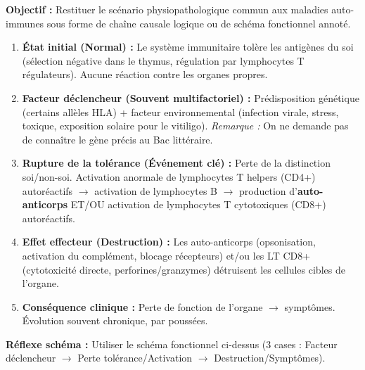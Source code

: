 \documentclass[11pt]{article}
\newcommand{\cle}[1]{{\popxbold\color{popdark}#1}}
\begin{document}
\begin{methode}
\textbf{Objectif :} Restituer le scénario physiopathologique commun aux maladies auto-immunes sous forme de chaîne causale logique ou de schéma fonctionnel annoté.
\begin{enumerate}
    \item \textbf{État initial (Normal) :} Le système immunitaire tolère les antigènes du \cle{soi} (sélection négative dans le thymus, régulation par lymphocytes T régulateurs). Aucune réaction contre les organes propres.
    \item \textbf{Facteur déclencheur (Souvent multifactoriel) :} Prédisposition génétique (certains allèles HLA) + facteur environnemental (infection virale, stress, toxique, exposition solaire pour le vitiligo). \emph{Remarque :} On ne demande pas de connaître le gène précis au Bac littéraire.
    \item \textbf{Rupture de la tolérance (Événement clé) :} Perte de la distinction soi/non-soi. Activation anormale de lymphocytes T helpers (CD4+) autoréactifs $\rightarrow$ activation de lymphocytes B $\rightarrow$ production d'\textbf{auto-anticorps} ET/OU activation de lymphocytes T cytotoxiques (CD8+) autoréactifs.
    \item \textbf{Effet effecteur (Destruction) :} Les auto-anticorps (opsonisation, activation du complément, blocage récepteurs) et/ou les LT CD8+ (cytotoxicité directe, perforines/granzymes) détruisent les cellules cibles de l'organe.
    \item \textbf{Conséquence clinique :} Perte de fonction de l'organe $\rightarrow$ symptômes. Évolution souvent chronique, par poussées.
\end{enumerate}
\textbf{Réflexe schéma :} Utiliser le schéma fonctionnel ci-dessus (3 cases : Facteur déclencheur $\rightarrow$ Perte tolérance/Activation $\rightarrow$ Destruction/Symptômes).
\end{methode}
\end{document}
